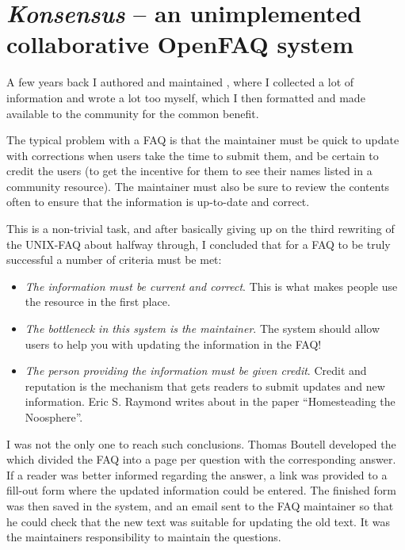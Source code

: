 
\chapter{\textit{Konsensus} -- an unimplemented collaborative OpenFAQ system}
\label{cha:konsensus}

A few years back I authored and maintained
,
where I collected a lot of information and wrote a lot too myself,
which I then formatted and made available to the community for the
common benefit.

The typical problem with a FAQ is that the maintainer must be quick to
update with corrections when users take the time to submit them, and
be certain to credit the users (to get the incentive for them to see
their names listed in a community resource).  The maintainer must also
be sure to review the contents often to ensure that the information is
up-to-date and correct.

This is a non-trivial task, and after basically giving up on the third
rewriting of the UNIX-FAQ about halfway through, I concluded that for
a FAQ to be truly successful a number of criteria must be met:

\begin{itemize}

\item \emph{The information must be current and correct}.  This is
  what makes people use the resource in the first place.
  
\item 
  \emph{The bottleneck in this system is the maintainer}.  The system
  should allow users to help you with updating the information in the
  FAQ!

  
\item \emph{The person providing the information must be given
    credit}.  Credit and reputation is the mechanism that gets readers
  to submit updates and new information.  Eric S. Raymond writes about
   in the paper
  ``Homesteading the Noosphere''.
\end{itemize}

I was not the only one to reach such conclusions.  Thomas Boutell
developed the  which divided the FAQ into a page per question with
the corresponding answer.  If a reader was better informed regarding
the answer, a link was provided to a fill-out form where the updated
information could be entered.  The finished form was then saved in the
system, and an email sent to the FAQ maintainer so that he could check
that the new text was suitable for updating the old text.  It was the
maintainers responsibility to maintain the questions.

